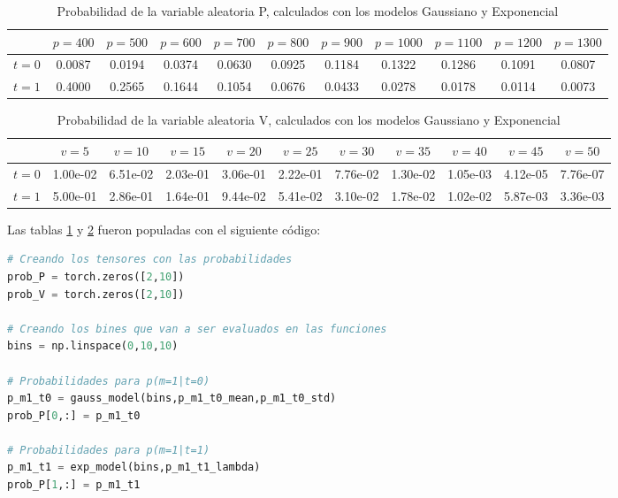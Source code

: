 \documentclass[spanish,english]{article}
\begin{document}
\begin{enumerate}
%
\begin{table}[hbtp!]
    \centering
    \begin{tabular}{|c|c|c|c|c|c|c|c|c|c|c|}
    \hline 
         &$p=400$&$p=500$&$p=600$&$p=700$&$p=800$&$p=900$&$p=1000$&$p=1100$&$p=1200$&$p=1300$\\
    \hline 
         $t=0$& 0.0087&0.0194&0.0374&0.0630&0.0925&0.1184&0.1322&0.1286&0.1091&0.0807\\
    \hline 
         $t=1$&0.4000&0.2565&0.1644&0.1054&0.0676&0.0433&0.0278&0.0178&0.0114&0.0073\\
    \hline 
    \end{tabular}
    \caption{Probabilidad de la variable aleatoria P, calculados con los modelos Gaussiano y Exponencial}
    \label{tab:prob_P}
\end{table}

%
\begin{table}[hbtp!]
    \centering
    \begin{tabular}{|c|c|c|c|c|c|c|c|c|c|c|}
    \hline 
         &$v=5$&$v=10$&$v=15$&$v=20$&$v=25$&$v=30$&$v=35$&$v=40$&$v=45$&$v=50$\\
    \hline 
         $t=0$&1.00e-02&6.51e-02&2.03e-01&3.06e-01&2.22e-01&7.76e-02&1.30e-02&1.05e-03&4.12e-05&7.76e-07\\
    \hline 
         $t=1$&5.00e-01&2.86e-01&1.64e-01&9.44e-02&5.41e-02&3.10e-02&1.78e-02&1.02e-02&5.87e-03&3.36e-03\\
    \hline 
    \end{tabular}
    \caption{Probabilidad de la variable aleatoria V, calculados con los modelos Gaussiano y Exponencial}
    \label{tab:prob_V}
\end{table}

Las tablas \ref{tab:prob_P} y \ref{tab:prob_V} fueron populadas con el siguiente c\'{o}digo:

\begin{lstlisting}[language=Python]
# Creando los tensores con las probabilidades
prob_P = torch.zeros([2,10])
prob_V = torch.zeros([2,10])

# Creando los bines que van a ser evaluados en las funciones
bins = np.linspace(0,10,10)

# Probabilidades para p(m=1|t=0)
p_m1_t0 = gauss_model(bins,p_m1_t0_mean,p_m1_t0_std)
prob_P[0,:] = p_m1_t0

# Probabilidades para p(m=1|t=1)
p_m1_t1 = exp_model(bins,p_m1_t1_lambda)
prob_P[1,:] = p_m1_t1


\end{lstlisting}
\end{enumerate}
\end{document}
